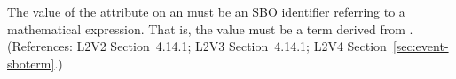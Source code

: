 The value of the  attribute on an \Event must be an SBO
identifier referring to a mathematical expression.  That is, the value must
be a term derived from \sboevent.  (References: L2V2 Section~4.14.1; L2V3
Section~4.14.1; L2V4 Section~\ref{sec:event-sboterm}.)
